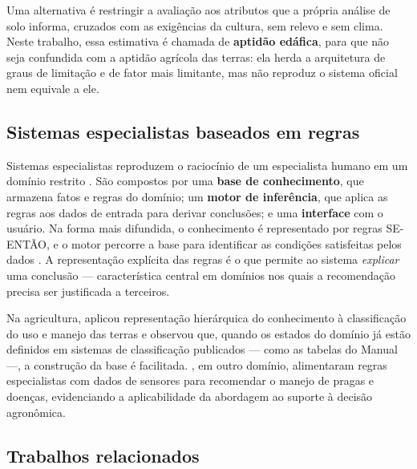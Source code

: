 Uma alternativa é restringir a avaliação aos atributos que a própria análise de solo informa,
cruzados com as exigências da cultura, sem relevo e sem clima. Neste trabalho, essa estimativa
é chamada de \textbf{aptidão edáfica}, para que não seja confundida com a aptidão agrícola das
terras: ela herda a arquitetura de graus de limitação e de fator mais limitante, mas não
reproduz o sistema oficial nem equivale a ele.

\subsection{Sistemas especialistas baseados em regras}\label{sec:rev_se}

Sistemas especialistas reproduzem o raciocínio de um especialista humano em um domínio
restrito \citep{Mendes1997}. São compostos por uma \textbf{base de conhecimento}, que
armazena fatos e regras do domínio; um \textbf{motor de inferência}, que aplica as regras aos
dados de entrada para derivar conclusões; e uma \textbf{interface} com o usuário. Na forma mais
difundida, o conhecimento é representado por regras SE-ENTÃO, e o motor percorre a base para
identificar as condições satisfeitas pelos dados \citep{Lanzer2009}. A representação explícita
das regras é o que permite ao sistema \emph{explicar} uma conclusão --- característica central
em domínios nos quais a recomendação precisa ser justificada a terceiros.

Na agricultura, \cite{Lanzer2009} aplicou representação hierárquica do conhecimento à
classificação do uso e manejo das terras e observou que, quando os estados do domínio já estão
definidos em sistemas de classificação publicados --- como as tabelas do Manual ---, a
construção da base é facilitada. \cite{Shahzadi2016}, em outro domínio, alimentaram regras
especialistas com dados de sensores para recomendar o manejo de pragas e doenças, evidenciando a
aplicabilidade da abordagem ao suporte à decisão agronômica.

\subsection{Trabalhos relacionados}\label{sec:rev_relacionados}

